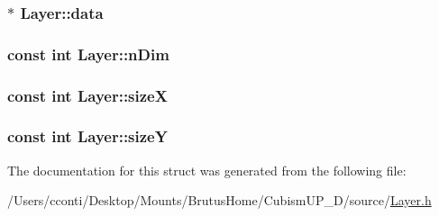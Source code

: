 \subsubsection[{data}]{$\ast$ Layer\+::data}\label{struct_layer_ab85c711ae2d70e26fb05644abd588c50}
\hypertarget{struct_layer_ab937eda50c83c45e9bc814f6be6abb46}{}
\subsubsection[{n\+Dim}]{\setlength{\rightskip}{0pt plus 5cm}const int Layer\+::n\+Dim}\label{struct_layer_ab937eda50c83c45e9bc814f6be6abb46}
\hypertarget{struct_layer_a4904db3e1890920dd364930bb68efa07}{}
\subsubsection[{size\+X}]{\setlength{\rightskip}{0pt plus 5cm}const int Layer\+::size\+X}\label{struct_layer_a4904db3e1890920dd364930bb68efa07}
\hypertarget{struct_layer_a7ec60475ab6fdf004e5ed4be01b1a318}{}
\subsubsection[{size\+Y}]{\setlength{\rightskip}{0pt plus 5cm}const int Layer\+::size\+Y}\label{struct_layer_a7ec60475ab6fdf004e5ed4be01b1a318}


The documentation for this struct was generated from the following file\+:\begin{DoxyCompactItemize}
\item 
/\+Users/cconti/\+Desktop/\+Mounts/\+Brutus\+Home/\+Cubism\+U\+P\+\_\+D/source/\hyperlink{_layer_8h}{Layer.\+h}\end{DoxyCompactItemize}
